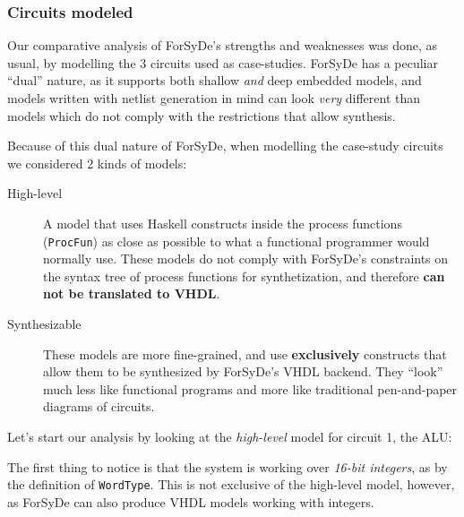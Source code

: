 \documentclass[a4paper]{article}
\begin{document}
            \subsubsection{Circuits modeled}
            \label{subsubsec:forsyde-circuits}
                Our comparative analysis of ForSyDe's strengths and weaknesses was done, as usual,
                by modelling the 3 circuits used as case-studies. ForSyDe has a peculiar ``dual''
                nature, as it supports both shallow \emph{and} deep embedded models, and models
                written with netlist generation in mind can look \emph{very} different than models
                which do not comply with the restrictions that allow synthesis.

                Because of this dual nature of ForSyDe, when modelling the case-study circuits
                we considered 2 kinds of models:

                \begin{description}
                    \item[High-level] A model that uses Haskell constructs inside the process
                        functions (\texttt{ProcFun}) as close as possible to what
                        a functional programmer would normally use. These models do not comply with
                        ForSyDe's constraints on the syntax tree of process functions for
                        synthetization, and therefore \textbf{can not be translated to VHDL}.

                    \item[Synthesizable] These models are more fine-grained, and use
                        \textbf{exclusively} constructs that allow them to be synthesized by
                        ForSyDe's VHDL backend. They ``look'' much less like functional programs and
                        more like traditional pen-and-paper diagrams of circuits.
                \end{description}

                Let's start our analysis by looking at the \emph{high-level} model for circuit 1,
                the ALU:


                The first thing to notice is that the system is working over \emph{16-bit integers},
                as by the definition of \texttt{WordType}. This is not exclusive of the high-level
                model, however, as ForSyDe can also produce VHDL models working with integers.
\end{document}
